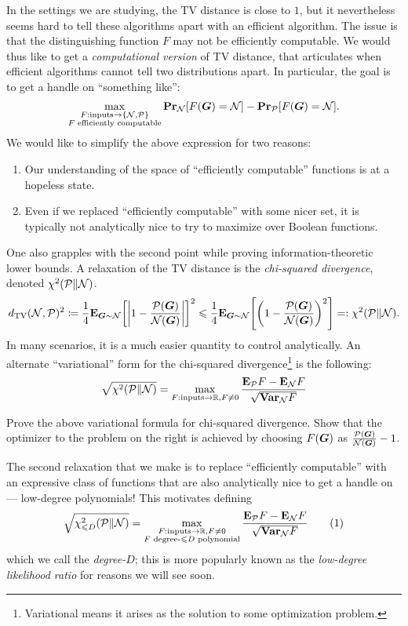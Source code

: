\documentclass[11pt, letterpaper]{article}
\newcommand{\Null}{\calN}
\newcommand{\Planted}{\calP}
\begin{document}
In the settings we are studying, the TV distance is close to $1$, but it nevertheless seems hard to tell these algorithms apart with an efficient algorithm.
The issue is that the distinguishing function $F$ may not be efficiently computable.
We would thus like to get a \emph{computational version} of TV distance, that articulates when efficient algorithms cannot tell two distributions apart.
In particular, the goal is to get a handle on ``something like'':
\[
    \max_{\substack{F:\text{inputs} \to \{\Null,\Planted\} \\
    F\text{ efficiently computable}}}
    \Pr_{\Null}[F(\bG) = \Null] - \Pr_{\Planted}[F(\bG) = \Null].
\]
We would like to simplify the above expression for two reasons:
\begin{enumerate}
    \item Our understanding of the space of ``efficiently computable'' functions is at a hopeless state.
    \item Even if we replaced ``efficiently computable'' with some nicer set, it is typically not analytically nice to try to maximize over Boolean functions.
\end{enumerate}
One also grapples with the second point while proving information-theoretic lower bounds.
A relaxation of the TV distance is the \emph{chi-squared divergence}, denoted $\chi^2(\Planted\|\Null)$.
\[
    d_{\mathrm{TV}}(\Null,\Planted)^2 \coloneqq \frac{1}{4}\E_{\bG\sim\Null}\bracks*{\abs*{ 1 - \frac{\Planted(\bG)}{\Null(\bG)} }}^2 \le \frac{1}{4}{\E_{\bG\sim\Null}\bracks*{ \parens*{ 1 - \frac{\Planted(\bG)}{\Null(\bG)} }^2 } } =: \chi^2(\Planted\|\Null).
\]
In many scenarios, it is a much easier quantity to control analytically.
An alternate ``variational'' form for the chi-squared divergence\footnote{Variational means it arises as the solution to some optimization problem.} is the following:
\[
    \sqrt{\chi^2(\Planted\|\Null)} = \max_{F:\text{inputs}\to\R, F\ne 0} \frac{\E_{\Planted} F - \E_{\Null} F}{\sqrt{\Var_{\Null} F}}
\]
\begin{tcolorbox}[arc=3mm,colback=White,coltext=Black,boxrule=1pt]
    \begin{exercise}
        Prove the above variational formula for chi-squared divergence.
        Show that the optimizer to the problem on the right is achieved by choosing $F(\boldsymbol{G})$ as $\frac{\Planted(\bG)}{\Null(\bG)} - 1$.
    \end{exercise}
\end{tcolorbox}
The second relaxation that we make is to replace ``efficiently computable'' with an expressive class of functions that are also analytically nice to get a handle on --- low-degree polynomials!
This motivates defining
\[
    \sqrt{\chi^2_{\le D}(\Planted\|\Null)} = \max_{\substack{F:\text{inputs}\to\R, F\ne 0 \\ F \text{ degree-}\le D\text{ polynomial}}} \frac{\E_{\Planted} F - \E_{\Null} F}{\sqrt{\Var_{\Null} F}} \numberthis \label{eq:low-degree}
\]
which we call the \emph{degree-}$D$; this is more popularly known as the \emph{low-degree likelihood ratio} for reasons we will see soon.
\end{document}
